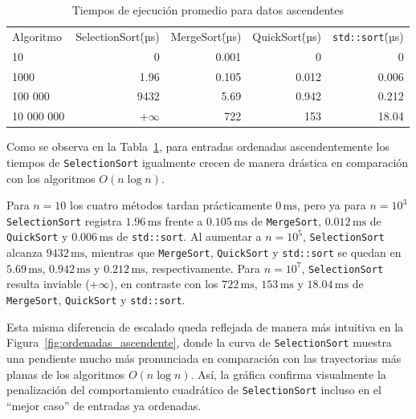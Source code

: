 \begin{table}[ht]
  \centering
  \begin{tabular}{lrrrr}

    Algoritmo  & SelectionSort\.(µs) & MergeSort\.(µs) & QuickSort\.(µs)  & \texttt{std::sort}\.(µs) \\

    10  & 0 & 0.001 & 0 & 0 \\
    1000& 1.96& 0.105& 0.012 & 0.006\\
    100 000& 9432& 5.69&0.942&0.212\\
    10 000 000 & +$\infty$ & 722& 153 &18.04\\

  \end{tabular}
  \caption{Tiempos de ejecución promedio para datos ascendentes}
  \label{tab:sorting-results2}
\end{table}

Como se observa en la Tabla~\ref{tab:sorting-results2}, para entradas ordenadas ascendentemente los tiempos de \texttt{SelectionSort} igualmente  crecen de manera drástica en comparación con los algoritmos $O(n\log n)$.

Para $n=10$ los cuatro métodos tardan prácticamente $0\,\mathrm{ms}$, pero ya para $n=10^3$ \texttt{SelectionSort} registra $1.96\,\mathrm{ms}$ frente a $0.105\,\mathrm{ms}$ de \texttt{MergeSort}, $0.012\,\mathrm{ms}$ de \texttt{QuickSort} y $0.006\,\mathrm{ms}$ de \texttt{std::sort}. Al aumentar a $n=10^5$, \texttt{SelectionSort} alcanza $9432\,\mathrm{ms}$, mientras que \texttt{MergeSort}, \texttt{QuickSort} y \texttt{std::sort} se quedan en $5.69\,\mathrm{ms}$, $0.942\,\mathrm{ms}$ y $0.212\,\mathrm{ms}$, respectivamente. Para $n=10^7$, \texttt{SelectionSort} resulta inviable (+$\infty$), en contraste con los $722\,\mathrm{ms}$, $153\,\mathrm{ms}$ y $18.04\,\mathrm{ms}$ de \texttt{MergeSort}, \texttt{QuickSort} y \texttt{std::sort}.

Esta misma diferencia de escalado queda reflejada de manera más intuitiva en la Figura~\ref{fig:ordenadas_ascendente}, donde la curva de \texttt{SelectionSort} muestra una pendiente mucho más pronunciada en comparación con las trayectorias más planas de los algoritmos $O(n\log n)$. Así, la gráfica confirma visualmente la penalización  del comportamiento cuadrático de \texttt{SelectionSort} incluso en el “mejor caso” de entradas ya ordenadas.  

